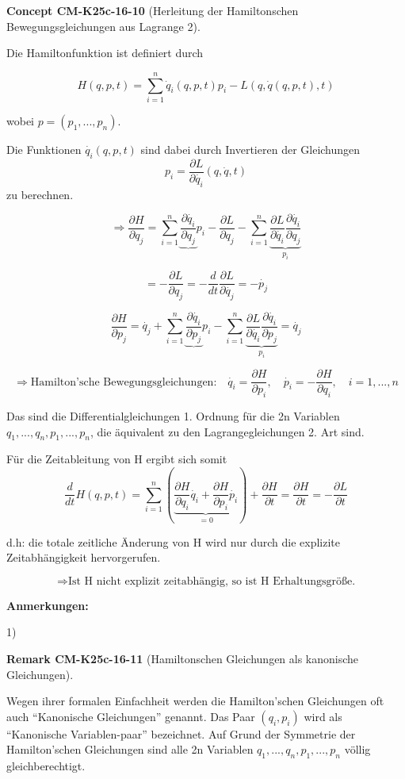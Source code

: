 \documentclass[10pt, letterpaper]{article}
\newcommand{\CustomHeading}[3]{%
  \par\medskip\noindent%
  \textbf{#1 #2} \textnormal{(#3)}.\enskip%
}
\newenvironment{REM}[2]{\begin{unitbox}\CustomHeading{Remark}{#1}{#2}}{\end{unitbox}}
\newenvironment{CONC}[2]{\begin{unitbox}\CustomHeading{Concept}{#1}{#2}}{\end{unitbox}}
\begin{document}
\begin{CONC}{CM-K25c-16-10}{Herleitung der Hamiltonschen Bewegungsgleichungen aus Lagrange 2}
Die Hamiltonfunktion ist definiert durch

\[
H(q,p,t) = \sum_{i=1}^n \dot{q}_i(q,p,t)p_i - L(q,\dot{q}(q,p,t),t)
\]

wobei $p=(p_1,...,p_n)$.

Die Funktionen $\dot{q_i}(q,p,t)$ sind dabei durch Invertieren der Gleichungen
\[p_i = \frac{\partial L}{\partial \dot{q_i}}(q,\dot{q},t)\] zu berechnen.

\[\Rightarrow \frac{\partial H}{\partial q_j} = \sum_{i=1}^n \underbrace{\frac{\partial \dot{q_i}}{\partial q_j}}_{} p_i - \frac{\partial L}{\partial q_j} - \sum_{i=1}^n \underbrace{\frac{\partial L}{\partial \dot{q_i}} \frac{\partial \dot{q_i}}{\partial q_j}}_{p_i}\]

\[= -\frac{\partial L}{\partial q_j} = -\frac{d}{dt}\frac{\partial L}{\partial \dot{q_j}} = -\dot{p_j}\]

\[\frac{\partial H}{\partial p_j} = \dot{q_j} + \sum_{i=1}^n \underbrace{\frac{\partial \dot{q_i}}{\partial p_j}}_{} p_i - \sum_{i=1}^n \underbrace{\frac{\partial L}{\partial \dot{q_i}} \frac{\partial \dot{q_i}}{\partial p_j}}_{p_i} = \dot{q_j}\]

\[\Rightarrow \boxed{\text{Hamilton'sche Bewegungsgleichungen:}\quad  \dot{q_i} = \frac{\partial H}{\partial p_i}, \quad \dot{p_i} = -\frac{\partial H}{\partial q_i}, \quad i=1,...,n}\]

Das sind die Differentialgleichungen 1. Ordnung für die 2n Variablen $q_1,...,q_n, p_1,...,p_n$, die äquivalent zu den Lagrangegleichungen 2. Art sind.

Für die Zeitableitung von H ergibt sich somit
\[\frac{d}{dt}H(q,p,t) = \sum_{i=1}^n \left(\underbrace{\frac{\partial H}{\partial q_i}\dot{q_i} + \frac{\partial H}{\partial p_i}\dot{p_i}}_{=0}\right) + \frac{\partial H}{\partial t} = \frac{\partial H}{\partial t} = -\frac{\partial L}{\partial t}\]

d.h: die totale zeitliche Änderung von H wird nur durch die explizite Zeitabhängigkeit hervorgerufen.

\[\Rightarrow \text{Ist H nicht explizit zeitabhängig, so ist H Erhaltungsgröße.}\]
\end{CONC}


\textbf{Anmerkungen:}

1) 

\begin{REM}{CM-K25c-16-11}{Hamiltonschen Gleichungen als kanonische Gleichungen}
Wegen ihrer formalen Einfachheit werden die Hamilton'schen Gleichungen oft auch ``Kanonische Gleichungen'' genannt. Das Paar $(q_i, p_i)$ wird als ``Kanonische Variablen-paar'' bezeichnet. Auf Grund der Symmetrie der Hamilton'schen Gleichungen sind alle 2n Variablen $q_1,...,q_n, p_1,...,p_n$ völlig gleichberechtigt.
\end{REM}
\end{document}
